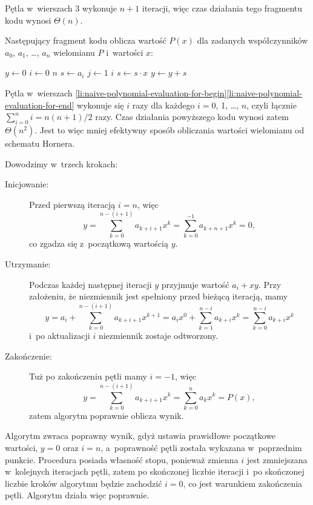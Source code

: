
\subproblem %
Pętla  w~wierszach 3 wykonuje $n+1$ iteracji, więc czas działania tego fragmentu kodu wynosi $\Theta(n)$.

\subproblem %
Następujący fragment kodu oblicza wartość $P(x)$ dla zadanych współczynników $a_0$, $a_1$, \dots, $a_n$ wielomianu $P$ i~wartości $x$:
\begin{codebox}
\li	$y\gets0$
\li	\For $i\gets0$ \To $n$
\li		\Do $s\gets a_i$
\li			\For $j\gets1$ \To $i$ \label{li:naive-polynomial-evaluation-for-begin}
\li				\Do $s\gets s\cdot x$
				\End \label{li:naive-polynomial-evaluation-for-end}
\li			$y\gets y+s$
		\End
\end{codebox}

Pętla  w~wierszach \ref{li:naive-polynomial-evaluation-for-begin}\nbendash\ref{li:naive-polynomial-evaluation-for-end} wykonuje się $i$ razy dla każdego $i=0$, 1, \dots, $n$, czyli łącznie $\sum_{i=0}^ni=n(n+1)/2$ razy.
Czas działania powyższego kodu wynosi zatem $\Theta(n^2)$.
Jest to więc mniej efektywny sposób obliczania wartości wielomianu od schematu Hornera.

\subproblem %
Dowodzimy w~trzech krokach:
\begin{description}
	\item[Inicjowanie:] Przed pierwszą iteracją $i=n$, więc
	\[
	    y = \sum_{k=0}^{n-(i+1)}a_{k+i+1}x^k = \sum_{k=0}^{-1}a_{k+n+1}x^k = 0,
	\]
	co zgadza się z~początkową wartością $y$.
	\item[Utrzymanie:] Podczas każdej następnej iteracji $y$ przyjmuje wartość $a_i+xy$.
Przy założeniu, że niezmiennik jest spełniony przed bieżącą iteracją, mamy
	\[
		y = a_i+\sum_{k=0}^{n-(i+1)}a_{k+i+1}x^{k+1} = a_ix^0+\sum_{k=1}^{n-i}a_{k+i}x^k = \sum_{k=0}^{n-i}a_{k+i}x^k
	\]
	i~po aktualizacji $i$ niezmiennik zostaje odtworzony.
	\item[Zakończenie:] Tuż po zakończeniu pętli mamy $i=-1$, więc
	\[
		y = \sum_{k=0}^{n-(i+1)}a_{k+i+1}x^k = \sum_{k=0}^na_kx^k = P(x),
	\]
	zatem algorytm poprawnie oblicza wynik.
\end{description}

\subproblem %
Algorytm zwraca poprawny wynik, gdyż ustawia prawidłowe początkowe wartości, $y=0$ oraz $i=n$, a~poprawność pętli  została wykazana w~poprzednim punkcie.
Procedura posiada własność stopu, ponieważ zmienna $i$ jest zmniejszana w~kolejnych iteracjach pętli, zatem po skończonej liczbie iteracji i~po skończonej liczbie kroków algorytmu będzie zachodzić $i=0$, co jest warunkiem zakończenia pętli.
Algorytm działa więc poprawnie.
